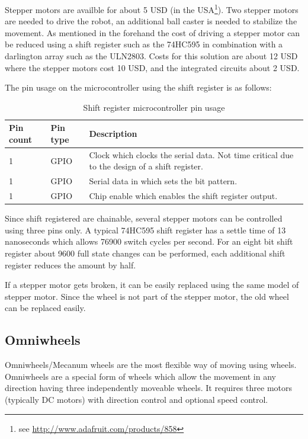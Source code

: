 Stepper motors are availble for about 5 USD (in the USA\footnote{see \url{http://www.adafruit.com/products/858}}). Two stepper motors are needed to drive the robot, an additional ball caster is needed to stabilize the movement. As mentioned in the forehand the cost of driving a stepper motor can be reduced using a shift register such as the 74HC595 in combination with a darlington array such as the ULN2803. Costs for this solution are about 12 USD where the stepper motors cost 10 USD, and the integrated circuits about 2 USD.

The pin usage on the microcontroller using the shift register is as follows:

\begin{table}[H]
\centering
\begin{tabular}{p{}p{}p{}}
\toprule
Pin count & Pin type & Description \\
\midrule
1 & GPIO & Clock which clocks the serial data. Not time critical due to the design of a shift register.\\
1 & GPIO & Serial data in which sets the bit pattern.\\
1 & GPIO & Chip enable which enables the shift register output.\\
\bottomrule
\end{tabular}
\caption{Shift register microcontroller pin usage}
\label{tbl:74hc595_pin}
\end{table}

Since shift registered are chainable, several stepper motors can be controlled using three pins only. A typical 74HC595 shift register has a settle time of 13 nanoseconds which allows 76900 switch cycles per second. For an eight bit shift register about 9600 full state changes can be performed, each additional shift register reduces the amount by half.

If a stepper motor gets broken, it can be easily replaced using the same model of stepper motor. Since the wheel is not part of the stepper motor, the old wheel can be replaced easily.
\subsection{Omniwheels}
Omniwheels/Mecanum wheels are the most flexible way of moving using wheels. Omniwheels are a special form of wheels which allow the movement in any direction having three independently moveable wheels. It requires three motors (typically DC motors) with direction control and optional speed control. \cite{ferriere1996design}

